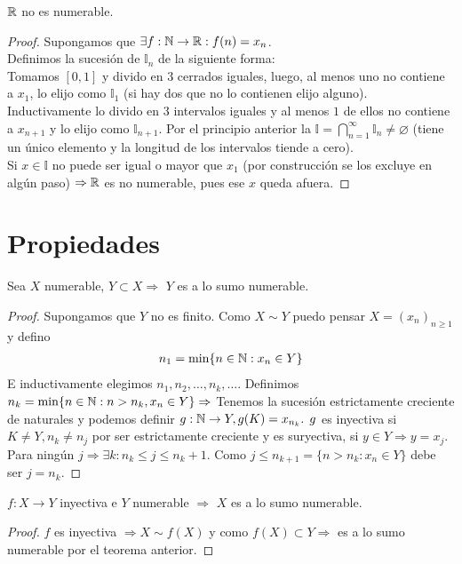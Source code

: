 \begin{theorem}
	\(\mathbb{R} \)  no es numerable.
	\begin{proof}
		Supongamos que \(\exists f:\mathbb{N} \to \mathbb{R} : f(n) = x_n\). \\
		Definimos la sucesión de \(\mathbb{I}_n\) de la siguiente forma: \\
		Tomamos \([0, 1]\) y divido en \(3\) cerrados iguales, luego, al menos uno no contiene a \(x_1\), lo elijo como \(\mathbb{I}_1\) (si  hay dos que no lo contienen elijo alguno). Inductivamente lo divido en \(3\) intervalos iguales y al menos \(1\) de ellos no contiene a \(x_{n+1} \) y lo elijo como \(\mathbb{I}_{n+1} \). Por el principio anterior la \(\mathbb{I} = \bigcap_{n=1}^\infty \mathbb{I}_n \neq \varnothing \) (tiene un único elemento y la longitud de los intervalos tiende a cero). \\
		Si \(x \in \mathbb{I} \) no puede ser igual o mayor que \(x_1\) (por construcción se los excluye en algún paso) \(\Rightarrow \mathbb{R} \) es no numerable, pues ese \(x\) queda afuera.
	\end{proof}
\end{theorem}

\section{Propiedades}

\begin{theorem}
	Sea \(X\) numerable, \(Y \subset X \Rightarrow \) \(Y\) es a lo sumo numerable.
	\begin{proof}
		Supongamos que \(Y\) no es finito. Como \(X \sim Y\) puedo pensar \(X = {(x_n)}_{n\geq1} \) y defino
		\begin{align*}
			n_1= \min \{ n \in \mathbb{N}: x_n \in Y \}
		\end{align*}
		E inductivamente elegimos \(n_1, n_2, \ldots , n_k, \ldots \). Definimos \(n_k = \min \{ n \in \mathbb{N} : n > n_k, x_n \in Y \} \Rightarrow \) Tenemos la sucesión estrictamente creciente de naturales y podemos definir \(g: \mathbb{N} \to Y, g(K) = x_{n_k} \text{. } g\) es inyectiva si \(K\neq Y, n_k \neq n_j\) por ser estrictamente creciente y es suryectiva, si \(y \in Y \Rightarrow y = x_j\). Para ningún \(j \Rightarrow \exists k :n_k\leq j \leq n_k+1\). Como \(j \leq n_{k+1}=\{ n>n_k:x_n \in Y \} \) debe ser \(j = n_k\).
	\end{proof}
\end{theorem}

\begin{corollary}
	\(f: X \to Y\) inyectiva e \(Y\) numerable \(\Rightarrow \) \(X\) es a lo sumo numerable.
	\begin{proof}
		\(f\) es inyectiva \(\Rightarrow X \sim f(X)\) y como \(f(X) \subset Y \Rightarrow \) es a lo sumo numerable por el teorema anterior.
	\end{proof}
\end{corollary}

